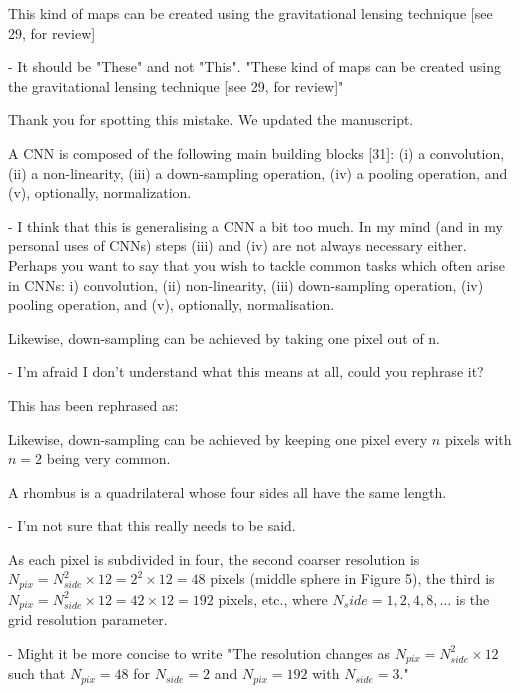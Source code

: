 \documentclass[12pt,a4paper]{article}
\newcommand{\TK}[1]{{\color{red}{TK: #1}}}
\newcommand{\todo}[1]{{\color[rgb]{.6,.1,.6}{TODO: #1}}}
\newcommand{\1}{\b{1}}              %
\newcommand{\0}{\b{0}}              %
\begin{document}
\begin{mdframed}[style=comment]
This kind of maps can be created using the gravitational lensing technique [see 29, for review]

- It should be "These" and not "This". "These kind of maps can be created using the gravitational lensing technique [see 29, for review]"
\end{mdframed}
Thank you for spotting this mistake. We updated the manuscript.

\begin{mdframed}[style=comment]
A CNN is composed of the following main building blocks [31]: (i) a convolution, (ii) a non-linearity, (iii) a down-sampling operation, (iv) a pooling operation, and (v), optionally, normalization.

- I think that this is generalising a CNN a bit too much. In my mind (and in my personal uses of CNNs) steps (iii) and (iv) are not always necessary either. Perhaps you want to say that you wish to tackle common tasks which often arise in CNNs: i) convolution, (ii) non-linearity, (iii) down-sampling operation, (iv) pooling operation, and (v), optionally, normalisation.
\end{mdframed}
\todo{assigned: @michael}


\begin{mdframed}[style=comment]
Likewise, down-sampling can be achieved by taking one pixel out of n.

- I'm afraid I don't understand what this means at all, could you rephrase it?
\end{mdframed}
This has been rephrased as:
\begin{mdframed}[style=manuscript]
Likewise, down-sampling can be achieved by keeping one pixel every $n$ pixels with $n=2$ being very common.
\end{mdframed}

\begin{mdframed}[style=comment]
A rhombus is a quadrilateral whose four sides all have the same length.

- I'm not sure that this really needs to be said.
\end{mdframed}
\todo{assigned: @michael}

\begin{mdframed}[style=comment]
As each pixel is subdivided in four, the second coarser resolution is $N_{pix} = N_{side}^2\times12=2^2\times12=48$ pixels (middle sphere in Figure 5), the third is $N_{pix} = N_{side}^2\times12=42\times12=192$ pixels, etc., where $N_side =1,2,4,8,\dots$ is the grid resolution parameter.

- Might it be more concise to write "The resolution changes as $N_{pix} = N^2_{side}\times12$ such that $N_{pix} = 48$ for $N_{side} = 2$ and $N_{pix} = 192$ with $N_{side}=3$."
\end{mdframed}
\TK{Thank you for the suggestion, we updated the text.}
\end{document}
